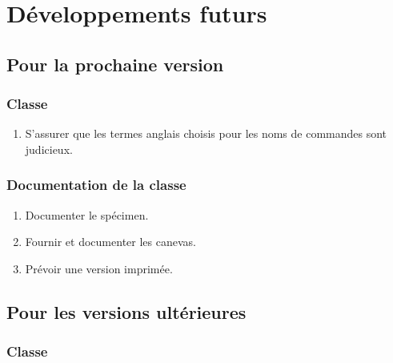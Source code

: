 \chapter{Développements futurs}\label{cha:devel-futurs}

\section{Pour la prochaine version}
\label{sec:pour-la-prochaine}

\subsection{Classe}
\label{sec:classe}

\begin{enumerate}
\item S'assurer que les termes anglais choisis pour les noms de commandes sont
  judicieux.
\end{enumerate}

\subsection{Documentation de la classe}
\label{sec:documentation-de-la}

\begin{enumerate}
\item Documenter le spécimen.
\item Fournir et documenter les canevas.
\item Prévoir une version imprimée.
\end{enumerate}

\section{Pour les versions ultérieures}
\label{sec:pour-les-versions}

\subsection{Classe}
\label{sec:classe-ult}

